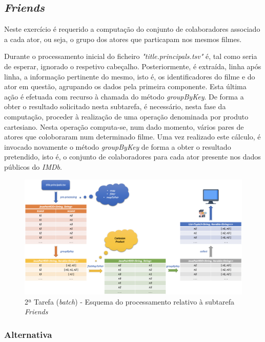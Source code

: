 \documentclass[a4paper]{report}
\begin{document}
        \subsection{\textit{Friends}} \label{subsec:Task2-Friends}
            Neste exercício é requerido a computação do conjunto de colaboradores associado a cada ator, ou seja, o grupo dos atores que particapam nos mesmos filmes.
                
            Durante o processamento inicial do ficheiro \textsl{"title.principals.tsv"} é, tal como seria de esperar, ignorado o respetivo cabeçalho.
            Posteriormente, é extraída, linha após linha, a informação pertinente do mesmo, isto é, os identificadores do filme e do ator em questão, agrupando os dados pela primeira componente. Esta última ação é efetuada com recurso à chamada do método \textit{groupByKey}.
            De forma a obter o resultado solicitado nesta subtarefa, é necessário, nesta fase da computação, proceder à realização de uma operação denominada por produto cartesiano. Nesta operação computa-se, num dado momento, vários pares de atores que coloboraram num determinado filme.
            Uma vez realizado este cálculo, é invocado novamente o método \textit{groupByKey} de forma a obter o resultado pretendido, isto é, o conjunto de colaboradores para cada ator presente nos dados públicos do \textit{IMDb}.

            \begin{figure}[H]
                \centering
                \includegraphics[width=1.0\textwidth]{Imagens/2ª Tarefa - Friends.png}
                \caption{2ª Tarefa (\textit{batch}) - Esquema do processamento relativo à subtarefa \textit{Friends}}
                \label{fig:14}
            \end{figure}

            \subsubsection{Alternativa} \label{sssec:Task2-Friends-Alternativa}
\end{document}
